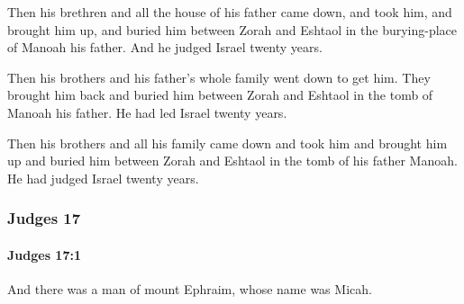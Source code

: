 			\begin{versebox}
					\item[BHS] 
					\item[ASV] Then his brethren and all the house of his father came down, and took him, and brought him up, and buried him between Zorah and Eshtaol in the burying-place of Manoah his father. And he judged Israel twenty years.
					\item[NIV] Then his brothers and his father’s whole family went down to get him. They brought him back and buried him between Zorah and Eshtaol in the tomb of Manoah his father. He had led Israel twenty years.
					\item[NRSV] Then his brothers and all his family came down and took him and brought him up and buried him between Zorah and Eshtaol in the tomb of his father Manoah. He had judged Israel twenty years.
			\end{versebox}
	\subsubsection{Judges 17} %
		\label{JUDGES-17}

		\paragraph{Judges 17:1} %
			\label{JUDGES-17-1}

			And there was a man of mount Ephraim, whose name was Micah.

